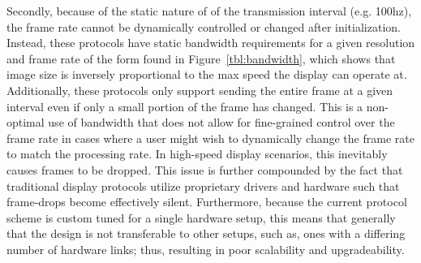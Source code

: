     Secondly, because of the static nature of of the transmission interval (e.g. 100hz), the frame rate cannot be dynamically controlled or changed after initialization. Instead, these protocols have static bandwidth requirements for a given resolution and frame rate of the form found in Figure~\ref{tbl:bandwidth}, which shows that image size is inversely proportional to the max speed the display can operate at. Additionally, these protocols only support sending the entire frame at a given interval even if only a small portion of the frame has changed. This is a non-optimal use of bandwidth that does not allow for fine-grained control over the frame rate in cases where a user might wish to dynamically change the frame rate to match the processing rate. In high-speed display scenarios, this inevitably causes frames to be dropped. This issue is further compounded by the fact that traditional display protocols utilize proprietary drivers and hardware such that frame-drops become effectively silent.  Furthermore, because the current protocol scheme is custom tuned for a single hardware setup, this means that generally that the design is not transferable to other setups, such as, ones with a differing number of hardware links; thus, resulting in poor scalability and upgradeability.


